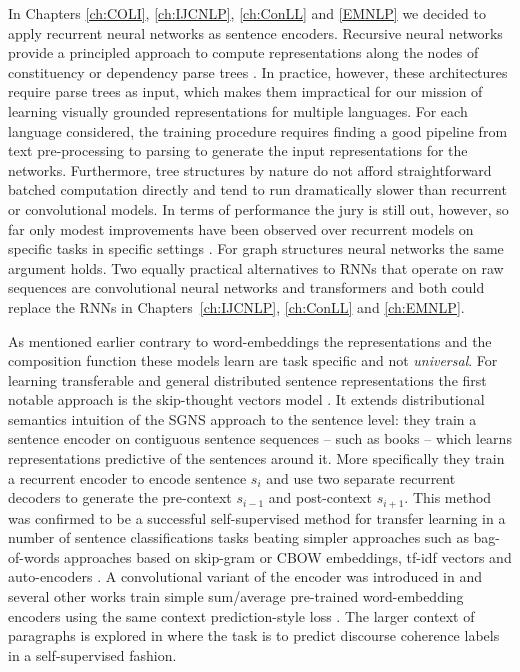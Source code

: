 In Chapters \ref{ch:COLI}, \ref{ch:IJCNLP}, \ref{ch:ConLL} and \ref{EMNLP} we decided to apply
recurrent neural networks as sentence encoders.
Recursive neural networks provide a principled approach to
compute representations along the nodes of constituency
or dependency parse trees \citep{socher2013recursive,socher2014grounded,le2015compositional,tai2015improved}.
In practice, however, these architectures require parse trees as input,
which makes them impractical for our mission of learning visually grounded
representations for multiple languages.
For each language considered, the training procedure requires finding a good
pipeline from text pre-processing to parsing to generate the input representations
for the networks. Furthermore, tree structures by nature do not
afford straightforward batched computation directly and tend to run dramatically
slower than recurrent or convolutional models. In terms of performance the jury
is still out, however, so far only modest improvements have been observed
over recurrent models on specific tasks in specific settings
\citep{li2015tree,tai2015improved}. For graph structures neural networks the
same argument holds. Two equally practical alternatives to RNNs
that operate on raw sequences are convolutional neural networks
\citep{bai2018empirical} and transformers \citep{vaswani2017attention} and both could
replace the RNNs in Chapters~\ref{ch:IJCNLP}, \ref{ch:ConLL} and \ref{ch:EMNLP}.



As mentioned earlier contrary to word-embeddings the representations
and the composition function these models learn are task specific and not \emph{universal}.
For learning transferable and general distributed sentence representations the
first notable approach is the
skip-thought vectors model \citep{kiros2015skip}.
It extends distributional semantics intuition of the SGNS approach to the sentence level:
they train a sentence encoder on contiguous sentence sequences
-- such as books -- which learns representations predictive of the sentences around it.
More specifically
they train a recurrent encoder to encode sentence $s_i$ and use two separate recurrent decoders to
generate the pre-context $s_{i-1}$ and post-context $s_{i+1}$.
This method was confirmed to be a successful self-supervised method for transfer
learning in a number of sentence
classifications tasks beating simpler approaches such as bag-of-words approaches based on skip-gram
or CBOW embeddings, tf-idf vectors and auto-encoders \citep{hill2016learning}. A convolutional
variant of the encoder was introduced in \cite{gan2016unsupervised} and several other works
train simple sum/average pre-trained word-embedding encoders using the same context prediction-style
loss \citep{kenter2016siamese,hill2016learning}. The larger context of paragraphs is
explored in \cite{jernite2017discourse} where the task is to predict discourse coherence
labels in a self-supervised fashion.

